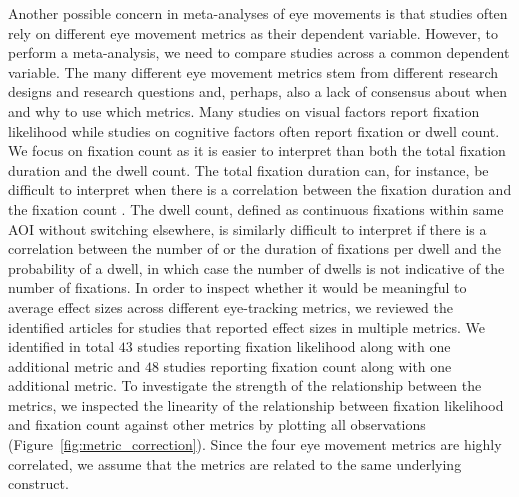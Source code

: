 \documentclass[english,natbib,man,floatsintext]{apa6}
\begin{document}
Another possible concern in meta-analyses of eye movements is that studies often rely on different eye movement metrics as their dependent variable. However, to perform a meta-analysis, we need to compare studies across a common dependent variable. The many different eye movement metrics stem from different research designs and research questions and, perhaps, also a lack of consensus about when and why to use which metrics. Many studies on visual factors report fixation likelihood while studies on cognitive factors often report fixation or dwell count. We focus on fixation count as it is easier to interpret than both the total fixation duration and the dwell count. The total fixation duration can, for instance, be difficult to interpret when there is a correlation between the fixation duration and the fixation count \citep{orquin2018a}. The dwell count, defined as continuous fixations within same AOI without switching elsewhere, is similarly difficult to interpret if there is a correlation between the number of or the duration of fixations per dwell and the probability of a dwell, in which case the number of dwells is not indicative of the number of fixations. In order to inspect whether it would be meaningful to average effect sizes across different eye-tracking metrics, we reviewed the identified articles for studies that reported effect sizes in multiple metrics. We identified in total $43$ studies reporting fixation likelihood along with one additional metric and $48$ studies reporting fixation count along with one additional metric. To investigate the strength of the relationship between the metrics, we inspected the linearity of the relationship between fixation likelihood and fixation count against other metrics by plotting all observations (Figure~\ref{fig:metric_correction}). Since the four eye movement metrics are highly correlated, we assume that the metrics are related to the same underlying construct.\\ 
\end{document}
